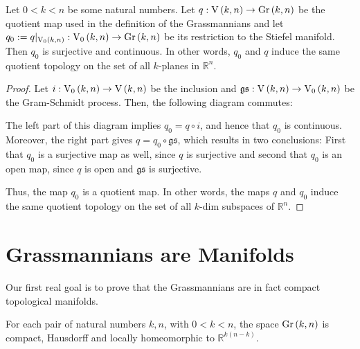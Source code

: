 \begin{proposition} Let $0<k<n$ be some natural numbers. Let $q:\St{k}{n}\to\Gr{k}{n}$ be the quotient map used in the definition of the Grassmannians and let $q_0:=q|_{\StO{k}{n}}:\StO{k}{n}\to\Gr{k}{n}$ be its restriction to the Stiefel manifold. Then $q_0$ is surjective and continuous. In other words, $q_0$ and $q$ induce the same quotient topology on the set of all $k$-planes in $\mathbb{R}^n$.
\end{proposition}
\begin{proof}
Let $i:\StO{k}{n}\to\St{k}{n}$ be the inclusion and $\mathfrak{gs}:\St{k}{n}\to\StO{k}{n}$ be the Gram-Schmidt process. Then, the following diagram commutes:
\begin{center}
\end{center}
The left part of this diagram implies $q_0=q\circ i$, and hence that $q_0$ is continuous. Moreover, the right part gives $q=q_0\circ\mathfrak{gs}$, which results in two conclusions: First that $q_0$ is a surjective map as well, since $q$ is surjective and second that $q_0$ is an open map, since $q$ is open and $\mathfrak{gs}$ is surjective.

Thus, the map $q_0$ is a quotient map. In other words, the maps $q$ and $q_0$ induce the same quotient topology on the set of all $k$-dim subspaces of $\mathbb{R}^n$.
\end{proof}

\section{Grassmannians are Manifolds}
Our first real goal is to prove that the Grassmannians are in fact compact topological manifolds.
\begin{lemma}\label{lem:gr_manifold} For each pair of natural numbers $k,n$, with $0<k<n$, the space $\Gr{k}{n}$ is compact, Hausdorff and locally homeomorphic to $\mathbb{R}^{k(n-k)}$.
\end{lemma}

